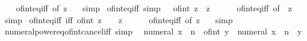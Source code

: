 \begin{isabellebody}
%
\isadelimproof
\ \ %
\endisadelimproof
%
\isatagproof
{}\isamarkupfalse%
\ of{\isacharunderscore}{\kern0pt}int{\isacharunderscore}{\kern0pt}eq{\isacharunderscore}{\kern0pt}iff\ {\isacharbrackleft}{\kern0pt}of\ z\ {}{\isacharbrackright}{\kern0pt}\ \isamarkupfalse%
\ simp%
\endisatagproof
{\isafoldproof}%
%
\isadelimproof
\isanewline
%
\endisadelimproof
\isanewline
{}\isamarkupfalse%
\ of{\isacharunderscore}{\kern0pt}int{\isacharunderscore}{\kern0pt}{}{\isacharunderscore}{\kern0pt}eq{\isacharunderscore}{\kern0pt}iff\ {\isacharbrackleft}{\kern0pt}simp{\isacharbrackright}{\kern0pt}{\isacharcolon}{\kern0pt}\ {\isachardoublequoteopen}{}\ {\isacharequal}{\kern0pt}\ of{\isacharunderscore}{\kern0pt}int\ z\ {\isasymlongleftrightarrow}\ z\ {\isacharequal}{\kern0pt}\ {}{\isachardoublequoteclose}\isanewline
%
\isadelimproof
\ \ %
\endisadelimproof
%
\isatagproof
{}\isamarkupfalse%
\ of{\isacharunderscore}{\kern0pt}int{\isacharunderscore}{\kern0pt}eq{\isacharunderscore}{\kern0pt}iff\ {\isacharbrackleft}{\kern0pt}of\ {}\ z{\isacharbrackright}{\kern0pt}\ \isamarkupfalse%
\ simp%
\endisatagproof
{\isafoldproof}%
%
\isadelimproof
\isanewline
%
\endisadelimproof
\isanewline
{}\isamarkupfalse%
\ of{\isacharunderscore}{\kern0pt}int{\isacharunderscore}{\kern0pt}eq{\isacharunderscore}{\kern0pt}{}{\isacharunderscore}{\kern0pt}iff\ {\isacharbrackleft}{\kern0pt}iff{\isacharbrackright}{\kern0pt}{\isacharcolon}{\kern0pt}\ {\isachardoublequoteopen}of{\isacharunderscore}{\kern0pt}int\ z\ {\isacharequal}{\kern0pt}\ {}\ {\isasymlongleftrightarrow}\ z\ {\isacharequal}{\kern0pt}\ {}{\isachardoublequoteclose}\isanewline
%
\isadelimproof
\ \ %
\endisadelimproof
%
\isatagproof
{}\isamarkupfalse%
\ of{\isacharunderscore}{\kern0pt}int{\isacharunderscore}{\kern0pt}eq{\isacharunderscore}{\kern0pt}iff\ {\isacharbrackleft}{\kern0pt}of\ z\ {}{\isacharbrackright}{\kern0pt}\ \isamarkupfalse%
\ simp%
\endisatagproof
{\isafoldproof}%
%
\isadelimproof
\isanewline
%
\endisadelimproof
\isanewline
{}\isamarkupfalse%
\ numeral{\isacharunderscore}{\kern0pt}power{\isacharunderscore}{\kern0pt}eq{\isacharunderscore}{\kern0pt}of{\isacharunderscore}{\kern0pt}int{\isacharunderscore}{\kern0pt}cancel{\isacharunderscore}{\kern0pt}iff\ {\isacharbrackleft}{\kern0pt}simp{\isacharbrackright}{\kern0pt}{\isacharcolon}{\kern0pt}\isanewline
\ \ {\isachardoublequoteopen}numeral\ x\ {\isacharcircum}{\kern0pt}\ n\ {\isacharequal}{\kern0pt}\ of{\isacharunderscore}{\kern0pt}int\ y\ {\isasymlongleftrightarrow}\ numeral\ x\ {\isacharcircum}{\kern0pt}\ n\ {\isacharequal}{\kern0pt}\ y{\isachardoublequoteclose}\isanewline

\end{isabellebody}
